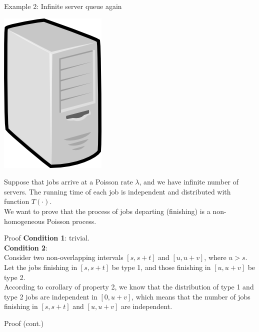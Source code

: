\documentclass[mathserif]{beamer}
\begin{document}
\begin{frame}{Example 2: Infinite server queue again}
\begin{center}
\includegraphics[scale=0.13]{server.png}
\end{center}
Suppose that jobs arrive at a Poisson rate $\lambda$, and we have infinite number of servers.
The running time of each job is independent and distributed with function $T(\cdot)$.\\
We want to prove that the process of jobs departing (finishing) is a non-homogeneous Poisson process.
\end{frame}

\begin{frame}{Proof}
\textbf{Condition 1}: trivial.\\
\vspace{\baselineskip}
\textbf{Condition 2}:\\
Consider two non-overlapping intervals $[s,s+t]$ and $[u,u+v]$, where $u > s$.
Let the jobs finishing in $[s,s+t]$ be type 1, and those finishing in $[u,u+v]$ be type 2.\\
According to corollary of property 2, we know that the distribution of type 1 and type 2 jobs are independent in $[0,u+v]$, which means that the number of jobs finishing in $[s,s+t]$ and $[u,u+v]$ are independent.
\end{frame}

\begin{frame}{Proof (cont.)}

\end{frame}
\end{document}
